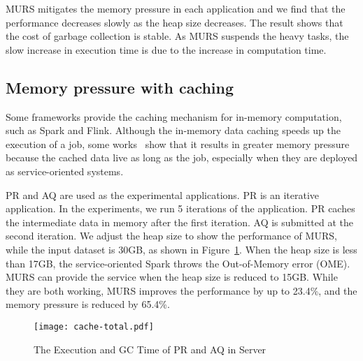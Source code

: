 MURS mitigates the memory pressure in each application and we find that the performance decreases slowly as the heap size decreases. The result shows that the cost of garbage collection is stable. As MURS suspends the heavy tasks, the slow increase in execution time is due to the increase in computation time.  

\begin{comment}
\begin{figure}[!t]
\centering
\texttt{[image: active-task.pdf]}
\caption{The minimum active tasks in each server}
\label{fig:active-task}
\end{figure}
\end{comment}

\subsection{Memory pressure with caching}

Some frameworks provide the caching mechanism for in-memory computation, such as Spark and Flink. Although the in-memory data caching speeds up the execution of a job, some works~\cite{bu:bloat, nguyen2015facade} show that it results in greater memory pressure because the cached data live as long as the job, especially when they are deployed as service-oriented systems. 

PR and AQ are used as the experimental applications. PR is an iterative application. In the experiments, we run 5 iterations of the application. PR caches the intermediate data in memory after the first iteration. AQ is submitted at the second iteration. 
We adjust the heap size to show the performance of MURS, while the input dataset is 30GB, as shown in Figure~\ref{fig:cache-total}. When the heap size is less than 17GB, the service-oriented Spark throws the Out-of-Memory error (OME). MURS can provide the service when the heap size is reduced to 15GB. While they are both working, MURS improves the performance by up to 23.4\%, and the memory pressure is reduced by 65.4\%.

\begin{figure}[!t]
\centering
\texttt{[image: cache-total.pdf]}
\vspace{-2mm}
\caption{The Execution and GC Time of PR and AQ in Server}
\vspace{-2mm}
\label{fig:cache-total}
\end{figure}

